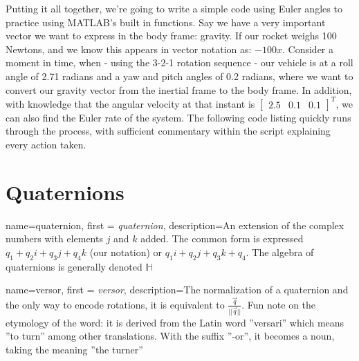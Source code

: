 \documentclass[12pt]{report}
\begin{document}
Putting it all together, we're going to write a simple code using Euler angles to practice using MATLAB's built in functions. Say we have a very important vector we want to express in the body frame: gravity. If our rocket weighs 100 Newtons, and we know this appears in vector notation as: $-100\hat{x}$. Consider a moment in time, when  - using the 3-2-1 rotation sequence - our vehicle is at a roll angle of 2.71 radians and a yaw and pitch angles of 0.2 radians, where we want to convert our gravity vector from the inertial frame to the body frame. In addition, with knowledge that the angular velocity at that instant is $\begin{bmatrix}
    2.5&0.1&0.1
\end{bmatrix}^T$, we can also find the Euler rate of the system. The following code listing quickly runs through the process, with sufficient commentary within the script explaining every action taken.

\lstset{style=mystyle}

\label{Euler Dynamics Listing}





\section{Quaternions}\label{sec:quaternions}
{
    name=quaternion,
    first = {\textit{quaternion}},
    description={An extension of the complex numbers with elements $j$ and $k$ added. The common form is expressed $q_1+q_2i+q_3j+q_4k$ (our notation) or $q_1i+q_2j+q_3k+q_4$. The algebra of quaternions is generally denoted $\mathbb{H}$}
}

{
    name=versor,
    first = {\textit{versor}},
    description={The normalization of a quaternion and the only way to encode rotations, it is equivalent to $\frac{\vec{q}}{||\vec{q}||}$. Fun note on the etymology of the word: it is derived from the Latin word ''versari'' which means ''to turn'' among other translations. With the suffix ''-or'', it becomes a noun, taking the meaning ''the turner''}
}
\end{document}
